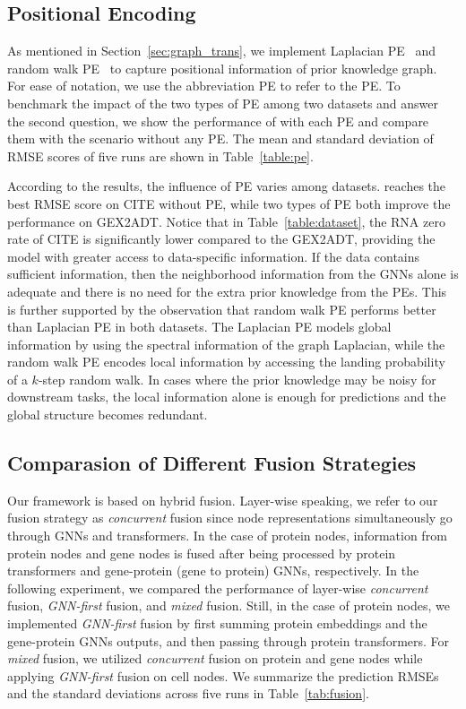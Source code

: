 \vspace{-0.5em}
\subsection{Positional Encoding}
\label{sec:pe}
As mentioned in Section~\ref{sec:graph_trans}, we implement Laplacian PE~\cite{dwivedi2020generalization} and random walk PE~\cite{dwivedi2022graph} to capture positional information of prior knowledge graph. For ease of notation, we use the abbreviation PE to refer to the PE. To benchmark the impact of the two types of PE among two datasets and answer the second question, we show the performance of \method{} with each PE and compare them with the scenario without any PE. The mean and standard deviation of RMSE scores of five runs are shown in Table~\ref{table:pe}. 

According to the results, the influence of PE varies among datasets. \method{} reaches the best RMSE score on CITE without PE, while two types of PE both improve the performance on GEX2ADT. Notice that in Table~\ref{table:dataset}, the RNA zero rate of CITE is significantly lower compared to the GEX2ADT, providing the model with greater access to data-specific information. If the data contains sufficient information, then the neighborhood information from the GNNs alone is adequate and there is no need for the extra prior knowledge from the PEs. This is further supported by the observation that random walk PE performs better than Laplacian PE in both datasets. The Laplacian PE models global information by using the spectral information of the graph Laplacian, while the random walk PE encodes local information by accessing the landing probability of a $k$-step random walk. In cases where the prior knowledge may be noisy for downstream tasks, the local information alone is enough for predictions and the global structure becomes redundant.



\subsection{Comparasion of Different Fusion Strategies}

Our framework is based on hybrid fusion. Layer-wise speaking, we refer to our fusion strategy as \textit{concurrent} fusion since node representations simultaneously go through GNNs and transformers. In the case of protein nodes, information from protein nodes and gene nodes is fused after being processed by protein transformers and gene-protein (gene to protein) GNNs, respectively. In the following experiment, we compared the performance of layer-wise \textit{concurrent} fusion, \textit{GNN-first} fusion, and \textit{mixed} fusion. Still, in the case of protein nodes, we implemented \textit{GNN-first} fusion by first summing protein embeddings and the gene-protein GNNs outputs, and then passing through protein transformers. For \textit{mixed} fusion, we utilized \textit{concurrent} fusion on protein and gene nodes while applying \textit{GNN-first} fusion on cell nodes. We summarize the prediction RMSEs and the standard deviations across five runs in Table~\ref{tab:fusion}.

